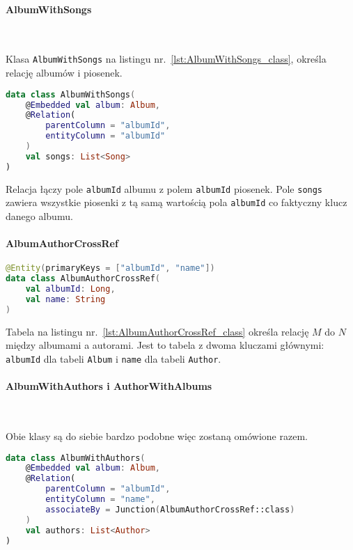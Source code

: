\paragraph{AlbumWithSongs} \label{sec:albumwithsongs} \

Klasa \texttt{AlbumWithSongs} na listingu nr.~\ref{lst:AlbumWithSongs_class}, określa relację albumów i piosenek. 

\begin{lstlisting}[caption=Deklaracja relacji \texttt{AlbumWithSongs}, label={lst:AlbumWithSongs_class}, language=kotlin]
data class AlbumWithSongs(
    @Embedded val album: Album,
    @Relation(
        parentColumn = "albumId",
        entityColumn = "albumId"
    )
    val songs: List<Song>
)
\end{lstlisting}

Relacja łączy pole \texttt{albumId} albumu z polem \texttt{albumId} piosenek. Pole \texttt{songs} zawiera wszystkie piosenki z tą samą wartością pola \texttt{albumId} co faktyczny klucz danego albumu.

\paragraph{AlbumAuthorCrossRef} \label{sec:AlbumAuthorCrossRef}

\begin{lstlisting}[caption=Deklaracja tabeli relacji \texttt{AlbumAuthorCrossRef}, label={lst:AlbumAuthorCrossRef_class}, language=kotlin]
@Entity(primaryKeys = ["albumId", "name"])
data class AlbumAuthorCrossRef(
    val albumId: Long,
    val name: String
)

\end{lstlisting}

Tabela na listingu nr.~\ref{lst:AlbumAuthorCrossRef_class} określa relację $M$ do $N$ między albumami a autorami. Jest to tabela z dwoma kluczami głównymi: \texttt{albumId} dla tabeli \texttt{Album} i \texttt{name} dla tabeli \texttt{Author}.

\paragraph{AlbumWithAuthors i AuthorWithAlbums} \

Obie klasy są do siebie bardzo podobne więc zostaną omówione razem. 

\begin{lstlisting}[caption=Deklaracja relacji \texttt{AlbumWithAuthors}, label={lst:AlbumWithAuthors_class}, language=kotlin]
data class AlbumWithAuthors(
    @Embedded val album: Album,
    @Relation(
        parentColumn = "albumId",
        entityColumn = "name",
        associateBy = Junction(AlbumAuthorCrossRef::class)
    )
    val authors: List<Author>
)
\end{lstlisting}

